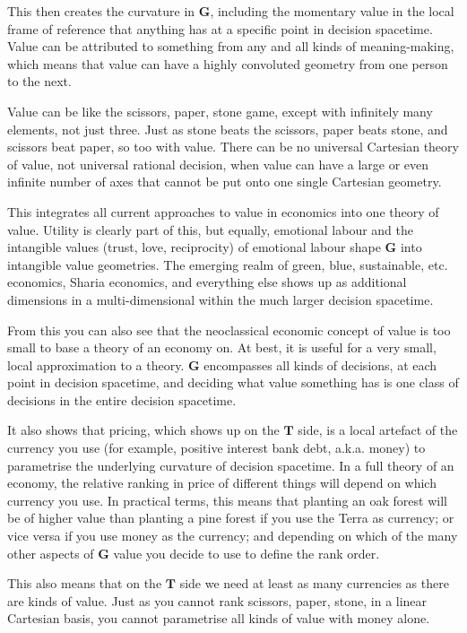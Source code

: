 This then creates the curvature in $\mathbf{G}$, including the momentary value in the local frame of reference that anything has at a specific point in decision spacetime. Value can be attributed to something from any and all kinds of meaning\hyp{}making, which means that value can have a highly convoluted geometry from one person to the next. 


Value can be like the scissors, paper, stone game, except with infinitely many elements, not just three. Just as stone beats the scissors, paper beats stone, and scissors beat paper, so too with value. There can be no universal Cartesian theory of value, not universal rational decision, when value can have a large or even infinite number of axes that cannot be put onto one single Cartesian geometry. 


This integrates all current approaches to value in economics into one theory of value. Utility is clearly part of this, but equally, emotional labour and the intangible values (trust, love, reciprocity) of emotional labour shape $\mathbf{G}$ into intangible value geometries. The emerging realm of green, blue, sustainable, etc. economics, Sharia economics, and everything else shows up as additional dimensions in a multi\hyp{}dimensional within the much larger decision spacetime.


From this you can also see that the neoclassical economic concept of value is too small to base a theory of an economy on. At best, it is useful for a very small, local approximation to a theory. $\mathbf{G}$ encompasses all kinds of decisions, at each point in decision spacetime, and deciding what value something has is one class of decisions in the entire decision spacetime.


It also shows that pricing, which shows up on the $\mathbf{T}$ side, is a local artefact of the currency you use (for example, positive interest bank debt, a.k.a. money) to parametrise the underlying curvature of decision spacetime. In a full theory of an economy, the relative ranking in price of different things will depend on which currency you use. In practical terms, this means that planting an oak forest will be of higher value than planting a pine forest if you use the Terra as currency; or vice versa if you use money as the currency; and depending on which of the many other aspects of $\mathbf{G}$ value you decide to use to define the rank order. 


This also means that on the $\mathbf{T}$ side we need at least as many currencies as there are kinds of value. Just as you cannot rank scissors, paper, stone, in a linear Cartesian basis, you cannot parametrise all kinds of value with money alone.


